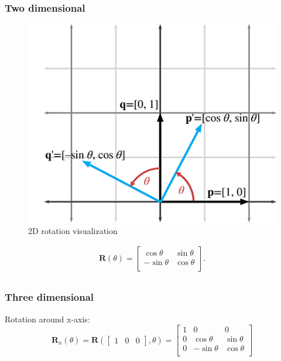 \documentclass[11pt]{article}
\begin{document}
\subsubsection{Two dimensional}

\begin{figure}[H]
\centering
    \includegraphics{05_2d_rotation}
\caption{2D rotation visualization}
\label{fig:2d-rotation-visualization}
\end{figure}

$$
\begin{matrix}
{\mathbf{R}(\theta) =
\begin{bmatrix}
{\cos\theta} & {\sin\theta} \\
{- \sin\theta} & {\cos\theta} \\
\end{bmatrix}.} \\
\end{matrix}
$$

\subsubsection{Three dimensional}

Rotation around x-axis: \\
$$
\mathbf{R}_{x}(\theta) = 
\mathbf{R}(
\begin{bmatrix}
1 & 0 & 0 
\end{bmatrix},
\theta) =
 \begin{bmatrix}
1 & 0 & 0 \\
0 & {\cos\theta} & {\sin\theta} \\
0 & {- \sin\theta} & {\cos\theta} \\
\end{bmatrix}
$$
\end{document}
